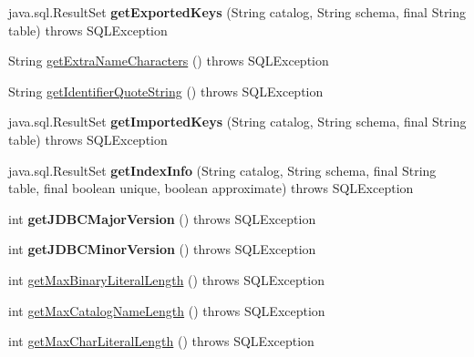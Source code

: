 \begin{DoxyCompactItemize}
java.\+sql.\+Result\+Set {\bfseries get\+Exported\+Keys} (String catalog, String schema, final String table)  throws S\+Q\+L\+Exception 
\item 
String \mbox{\hyperlink{classcom_1_1mysql_1_1cj_1_1jdbc_1_1_database_meta_data_a83cc190b4e0df20ef2aabe38bf08985c}{get\+Extra\+Name\+Characters}} ()  throws S\+Q\+L\+Exception 
\item 
String \mbox{\hyperlink{classcom_1_1mysql_1_1cj_1_1jdbc_1_1_database_meta_data_a4ad3801251fbf252463d6f02c0af30ac}{get\+Identifier\+Quote\+String}} ()  throws S\+Q\+L\+Exception 
\item 
\mbox{\label{classcom_1_1mysql_1_1cj_1_1jdbc_1_1_database_meta_data_adc8fcceec522ea001113c716efd56c16}} 
java.\+sql.\+Result\+Set {\bfseries get\+Imported\+Keys} (String catalog, String schema, final String table)  throws S\+Q\+L\+Exception 
\item 
\mbox{\label{classcom_1_1mysql_1_1cj_1_1jdbc_1_1_database_meta_data_a8df3107197ea5040b71532d8de238736}} 
java.\+sql.\+Result\+Set {\bfseries get\+Index\+Info} (String catalog, String schema, final String table, final boolean unique, boolean approximate)  throws S\+Q\+L\+Exception 
\item 
\mbox{\label{classcom_1_1mysql_1_1cj_1_1jdbc_1_1_database_meta_data_acf7ab48f588b46a8b2c8ea7c4dee7aa1}} 
int {\bfseries get\+J\+D\+B\+C\+Major\+Version} ()  throws S\+Q\+L\+Exception 
\item 
\mbox{\label{classcom_1_1mysql_1_1cj_1_1jdbc_1_1_database_meta_data_a42f15334f22a2e648401fb89c11b61cc}} 
int {\bfseries get\+J\+D\+B\+C\+Minor\+Version} ()  throws S\+Q\+L\+Exception 
\item 
int \mbox{\hyperlink{classcom_1_1mysql_1_1cj_1_1jdbc_1_1_database_meta_data_a0743906977e013ec4b83af02330db2e4}{get\+Max\+Binary\+Literal\+Length}} ()  throws S\+Q\+L\+Exception 
\item 
int \mbox{\hyperlink{classcom_1_1mysql_1_1cj_1_1jdbc_1_1_database_meta_data_a0bbcea8aa06a9b1953a31c5e82806bb4}{get\+Max\+Catalog\+Name\+Length}} ()  throws S\+Q\+L\+Exception 
\item 
int \mbox{\hyperlink{classcom_1_1mysql_1_1cj_1_1jdbc_1_1_database_meta_data_a8b9912f9db39e22957f00881a17d69fe}{get\+Max\+Char\+Literal\+Length}} ()  throws S\+Q\+L\+Exception 

\end{DoxyCompactItemize}
